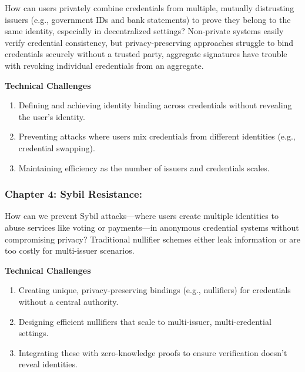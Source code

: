 
How can users privately combine credentials from multiple, mutually distrusting issuers (e.g., government IDs and bank statements) to prove they belong to the same identity, especially in decentralized settings? Non-private systems easily verify credential consistency, but privacy-preserving approaches struggle to bind credentials securely without a trusted party, aggregate signatures \cite{mir_aggregate_2023} have trouble with revoking individual credentials from an aggregate.

\noindent \textbf{Technical Challenges}
\begin{enumerate}
    \item Defining and achieving identity binding across credentials without revealing the user’s identity.
    \item Preventing attacks where users mix credentials from different identities (e.g., credential swapping).
    \item Maintaining efficiency as the number of issuers and credentials scales.
\end{enumerate}



\subsubsection*{Chapter 4: Sybil Resistance: } 




How can we prevent Sybil attacks—where users create multiple identities to abuse services like voting or payments—in anonymous credential systems without compromising privacy? Traditional nullifier schemes either leak information or are too costly for multi-issuer scenarios.

\noindent \textbf{Technical Challenges}
\begin{enumerate}
    \item Creating unique, privacy-preserving bindings (e.g., nullifiers) for credentials without a central authority.
    \item Designing efficient nullifiers that scale to multi-issuer, multi-credential settings.
    \item Integrating these with zero-knowledge proofs to ensure verification doesn’t reveal identities.
\end{enumerate}



